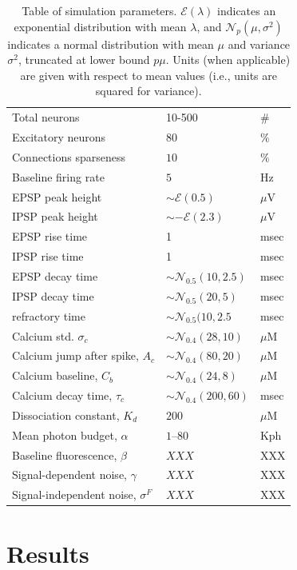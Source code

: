 \documentclass[aoas,preprint]{imsart}
\begin{document}
\begin{table}[h!b!p!]
\caption{Table of simulation parameters. $\mathcal{E}(\lambda)$ indicates an exponential distribution with mean $\lambda$, and $\mathcal{N}_p(\mu,\sigma^2)$ indicates a normal distribution with mean $\mu$ and variance $\sigma^2$, truncated at lower bound $p\mu$.  Units (when applicable) are given with respect to mean values (i.e., units are squared for variance).}\label{table:caparm}

\begin{tabular}{lll}
\hline
Total neurons & 10-500 & \# \\
Excitatory neurons & $80$ & $\%$ \\
Connections sparseness & $10$   & $\%$ \\
Baseline firing rate & $5$ & Hz\\
\hline
EPSP peak height 	& $\sim \mathcal{E}(0.5)$ & $\mu$V \\
IPSP peak height 	& $\sim -\mathcal{E}(2.3)$ & $\mu$V \\
EPSP rise time 		& 1 & msec \\
IPSP rise time 		& 1 & msec \\
EPSP decay time 	& $\sim \mathcal{N}_{0.5}(10,2.5)$ & msec \\
IPSP decay time 	& $\sim \mathcal{N}_{0.5}(20,5)$ & msec\\
refractory time 	& $\sim \mathcal{N}_{0.5}(10,2.5$ & msec \\
\hline
Calcium std. $\sigma_c$ & $\sim \mathcal{N}_{0.4}(28,10)$ & $\mu$M\\
Calcium jump after spike, $A_c$ &  $\sim \mathcal{N}_{0.4}(80,20)$ & $\mu$M\\
Calcium baseline, $C_b$ & $\sim \mathcal{N}_{0.4}(24,8)$ & $\mu$M\\
Calcium decay time, $\tau_c$ & $\sim \mathcal{N}_{0.4}(200,60)$ & msec\\
Dissociation constant, $K_d$ & $200$ & $\mu$M \\
\hline
Mean photon budget, $\alpha$ & $1$--$80$ & Kph \\
Baseline fluorescence, $\beta$ & $XXX$ & XXX \\
Signal-dependent noise, $\gamma$ & $XXX$ & XXX \\
Signal-independent noise, $\sigma^F$ & $XXX$ & XXX \\
\end{tabular}
\end{table}


\section{Results}
\label{sec:results}
\end{document}
